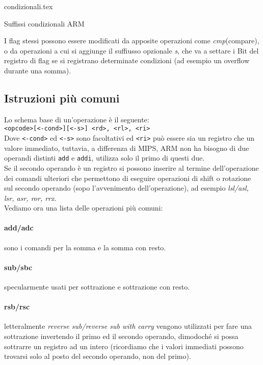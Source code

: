 \documentclass[class=book, crop=false, oneside]{standalone}
\begin{document}
\begin{table}[H]
	\centering
	{condizionali.tex}
	\caption*{Suffissi condizionali ARM}
\end{table}

I flag stessi possono essere modificati da apposite operazioni come \emph{cmp}(compare), o da operazioni a cui si aggiunge il suffiusso opzionale \emph{s}, che va a settare i Bit del registro di flag se si registrano determinate condizioni (ad esempio un overflow durante una somma).\\

\subsection*{Istruzioni più comuni}
Lo schema base di un'operazione è il seguente:\\
	\texttt{<opcode>[<-cond>][<-s>] <rd>, <rl>, <ri>}\\
Dove \texttt{<-cond>} ed \texttt{<-s>} sono facoltativi ed \texttt{<ri>} può essere sia un registro che un valore immediato, tuttavia, a differenza di MIPS, ARM non ha bisogno di due operandi distinti \texttt{add} e \texttt{addi}, utilizza solo il primo di questi due.\\
Se il secondo operando è un registro si possono inserire al termine dell'operazione dei comandi ulteriori che permettono di eseguire operazioni di shift o rotazione sul secondo operando (sopo l'avvenimento dell'operazione), ad esempio \emph{lsl/asl, lsr, asr, ror, rrx}.\\
Vediamo ora una lista delle operazioni più comuni:
\paragraph*{add/adc} sono i comandi per la somma e la somma con resto.
\paragraph{sub/sbc} specularmente usati per sottrazione e sottrazione con resto.
\paragraph*{rsb/rsc} letteralmente \emph{reverse sub/reverse sub with carry} vengono utilizzati per fare una sottrazione invertendo il primo ed il secondo operando, dimodoché si possa sottrarre un registro ad un intero (ricordiamo che i valori immediati possono trovarsi solo al posto del secondo operando, non del primo).
\end{document}
